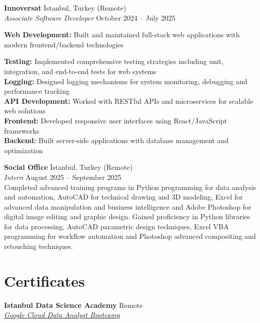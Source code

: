\documentclass[10pt,a4paper]{extarticle}
\begin{document}
\vspace{5pt}
\noindent\textbf{Innoversat} İstanbul, Turkey \hfill (Remote)\\
\textit{Associate Software Developer} \hfill October 2024 -- July 2025\\
\begin{itemize}[leftmargin=*,itemsep=1pt]
\textbf{Web Development:} Built and maintained full-stack web applications with modern frontend/backend technologies

\textbf{Testing:} Implemented comprehensive testing strategies including unit, integration, and end-to-end tests for web systems\\

\textbf{Logging:} Designed logging mechanisms for system monitoring, debugging and performance tracking\\

\textbf{API Development:} Worked with RESTful APIs and microservices for scalable web solutions\\

\textbf{Frontend:} Developed responsive user interfaces using React/JavaScript frameworks\\

\textbf{Backend:} Built server-side applications with database management and optimization\\

\end{itemize}

\vspace{5pt}
\noindent\textbf{Social Office} İstanbul, Turkey \hfill (Remote)\\
\textit{Intern} \hfill August 2025 -- September 2025\\
Completed advanced training programs in Python programming for data analysis and automation, AutoCAD for technical drawing and 3D modeling, Excel for advanced data manipulation and business intelligence and Adobe Photoshop for digital image editing and graphic design. Gained proficiency in Python libraries for data processing, AutoCAD parametric design techniques, Excel VBA programming for workflow automation and Photoshop advanced compositing and retouching techniques.

\vspace{9pt}

\section{Certificates}
\textbf{Istanbul Data Science Academy} \hfill Remote\\
\textit{\href{https://istdatascience.com/certificate/DABYO237.pdf}{Google Cloud Data Analyst Bootcamp}}
\end{document}
